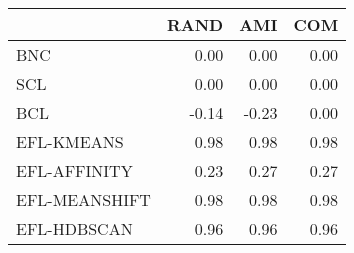 \begin{tabular}{lrrr}
\toprule
 & RAND & AMI & COM \\
\midrule
BNC & 0.00 & 0.00 & 0.00 \\
SCL & 0.00 & 0.00 & 0.00 \\
BCL & -0.14 & -0.23 & 0.00 \\
EFL-KMEANS & 0.98 & 0.98 & 0.98 \\
EFL-AFFINITY & 0.23 & 0.27 & 0.27 \\
EFL-MEANSHIFT & 0.98 & 0.98 & 0.98 \\
EFL-HDBSCAN & 0.96 & 0.96 & 0.96 \\
\bottomrule
\end{tabular}
